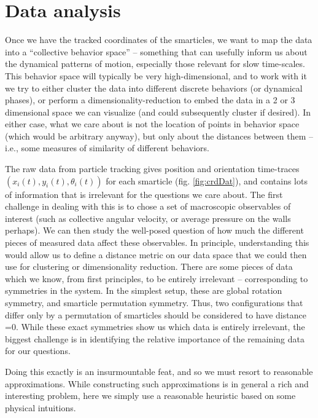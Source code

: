 \documentclass[11pt]{article}
\renewcommand{\=}[1]{\stackrel{#1}{=}} %
\renewcommand{\(}{\left (}
\renewcommand{\)}{\right  )}
\renewcommand{\[}{\left [}
\renewcommand{\]}{\right ]}
\newcommand{\<}{\left <}
\renewcommand{\>}{\right >}
\theoremstyle{definition}
\theoremstyle{remark}
\begin{document}
\section{Data analysis} \label{app:dataAnal}

Once we have the tracked coordinates of the smarticles, we want to map the data into a ``collective behavior space'' -- something that can usefully inform us about the dynamical patterns of motion, especially those relevant for slow time-scales. This behavior space will typically be very high-dimensional, and to work with it we try to either cluster the data into different discrete behaviors (or dynamical phases), or perform a dimensionality-reduction to embed the data in a 2 or 3 dimensional space we can visualize (and could subsequently cluster if desired). In either case, what we care about is not the location of points in behavior space (which would be arbitrary anyway), but only about the distances between them -- i.e., some measures of similarity of different behaviors. 

The raw data from particle tracking gives position and orientation time-traces $ (x_i(t), y_i(t), \theta_i(t)) $ for each smarticle (fig. \ref{fig:crdDat}), and contains lots of information that is irrelevant for the questions we care about. The first challenge in dealing with this is to chose a set of macroscopic observables of interest (such as collective angular velocity, or average pressure on the walls perhaps). We can then study the well-posed question of how much the different pieces of measured data affect these observables. In principle, understanding this would allow us to define a distance metric on our data space that we could then use for clustering or dimensionality reduction. There are some pieces of data which we know, from first principles, to be entirely irrelevant -- corresponding to symmetries in the system. In the simplest setup, these are global rotation symmetry, and smarticle permutation symmetry. Thus, two configurations that differ only by a permutation of smarticles should be considered to have distance =0. While these exact symmetries show us which data is entirely irrelevant, the biggest challenge is in identifying the relative importance of the remaining data for our questions. 

Doing this exactly is an insurmountable feat, and so we must resort to reasonable approximations. While constructing such approximations is in general a rich and interesting problem, here we simply use a reasonable heuristic based on some physical intuitions. 
\end{document}
